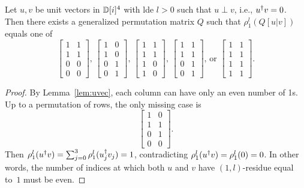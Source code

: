 \documentclass[reprint,amsmath,amssymb,aps,pra]{revtex4-2}
\begin{document}
\begin{lemma}
  \label{lem:v2}
  Let $u,v$ be unit vectors in ${\mathbb D}[i]^4$ with lde $l>0$ such that
  $u \perp v$, i.e., $u{^{\dagger}}v = 0$. Then there exists a generalized
  permutation matrix $Q$ such that $\rho_1^l(Q[u|v])$ equals one of
  \[
    \begin{bmatrix}
      1 & 1 \\
      1 & 1 \\
      0 & 0 \\
      0 & 0
    \end{bmatrix} \text{, }
    \begin{bmatrix}
      1 & 0 \\
      1 & 0 \\
      0 & 1 \\
      0 & 1
    \end{bmatrix} \text{, }
    \begin{bmatrix}
      1 & 1 \\
      1 & 1 \\
      1 & 0 \\
      1 & 0
    \end{bmatrix}\text{, }
    \begin{bmatrix}
      1 & 1 \\
      1 & 1 \\
      0 & 1 \\
      0 & 1
    \end{bmatrix}\text{, or }
    \begin{bmatrix}
      1 & 1 \\
      1 & 1 \\
      1 & 1 \\
      1 & 1
    \end{bmatrix}.
  \]
\end{lemma}

\begin{proof}
  By Lemma~\ref{lem:uvec}, each column can have only an even number of
  1s. Up to a permutation of rows, the only missing case is
  \[
    \begin{bmatrix}
      1 & 0 \\
      1 & 1 \\
      0 & 1 \\
      0 & 0
    \end{bmatrix}.
  \]
  Then
  $\rho_1^l(u^{\dagger} v)=\sum_{j=0}^{3}
  \rho_1^l(u_j^{\dagger}{v_j}) = 1$, contradicting
  $\rho_1^l(u^{\dagger} v)=\rho_1^l(0) = 0$. In other words, the number of
  indices at which both $u$ and $v$ have $(1,l)$-residue equal to~$1$
  must be even.
\end{proof}
\end{document}
